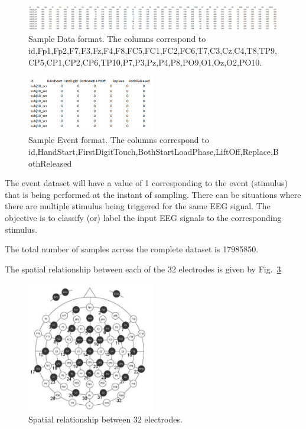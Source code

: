 \documentclass[final,leqno,onefignum,onetabnum]{siamltexmm}
\begin{document}
\begin{figure}[ht!]
  \centering
  \includegraphics[width=1\textwidth]{images/sample_data}
  \caption{Sample Data format.  The columns correspond to id,Fp1,Fp2,F7,F3,Fz,F4,F8,FC5,FC1,FC2,FC6,T7,C3,Cz,C4,T8,TP9,CP5,CP1,CP2,CP6,TP10,P7,P3,Pz,P4,P8,PO9,O1,Oz,O2,PO10.\label{fig:Sample_data}}
\end{figure}

\begin{figure}[ht!]
  \centering
  \includegraphics[width=0.5\textwidth]{images/sample_events}
  \caption{Sample Event format. The columns correspond to id,HandStart,FirstDigitTouch,BothStartLoadPhase,LiftOff,Replace,BothReleased\label{fig:sample_events}}
\end{figure}

The event dataset will have a value of 1 corresponding to the event (stimulus) that is being performed at the instant of sampling.  There can be situations where there are multiple stimulus being triggered for the same EEG signal.  The objective is to classify (or) label the input EEG signals to the corresponding stimulus.

The total number of samples across the complete dataset is 17985850.

The spatial relationship between each of the 32 electrodes is given by Fig.~\ref{fig:eeg_spatial_relation}

\begin{figure}
  \centering
  \includegraphics[width=0.5\textwidth]{images/eeg_spatial}
  \caption{Spatial relationship between 32 electrodes.\label{fig:eeg_spatial_relation}} 
\end{figure}
\end{document}
